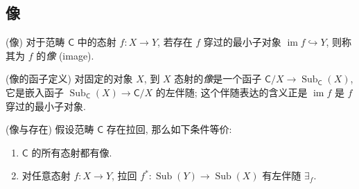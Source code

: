 
\subsection{像}

\begin{definition}
    [label={image-definition}]
    {(像)}
    对于范畴 $\mathsf C$ 中的态射 $f\colon X \to Y$, 若存在 $f$ 穿过的最小子对象 $\operatorname{im}f\hookrightarrow Y$, 则称其为 $f$ 的\emph{像} (image).
\end{definition}

\begin{remark}{(像的函子定义)}
    对固定的对象 $X$, 到 $X$ 态射的\emph{像}是一个函子 $\mathsf C /X \to \operatorname{Sub}_{\mathsf C}(X)$, 它是嵌入函子 $\operatorname{Sub}_{\mathsf C}(X) \to \mathsf C /X$ 的左伴随; 这个伴随表达的含义正是 $\operatorname{im}f$ 是 $f$ 穿过的最小子对象.
\end{remark}

\begin{prop}
    {(像与存在)}
    假设范畴 $\mathsf C$ 存在拉回, 那么如下条件等价:
    \begin{enumerate}[(1)]
        \item $\mathsf C$ 的所有态射都有像.
        \item 对任意态射 $f \colon X \to Y$,
        拉回 $f^* \colon \operatorname{Sub}(Y) \to \operatorname{Sub}(X)$ 有左伴随 $\exists_f$.
    \end{enumerate}
\end{prop}

